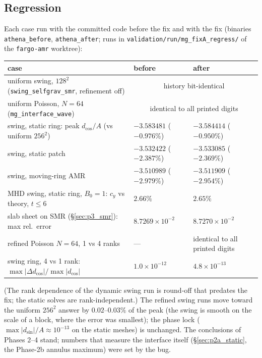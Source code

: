 \documentclass[11pt]{article}
\newcommand{\code}[1]{\texttt{#1}}
\newcommand{\file}[1]{\texttt{#1}}
\begin{document}
\subsection{Regression}
\label{sec:fcfix_regr}
Each case run with the committed code before the fix and with the fix (binaries
\file{athena\_before}, \file{athena\_after}; runs in \file{validation/run/mg\_fixA\_regress/} of
the \code{fargo-amr} worktree):
\begin{center}
\footnotesize\setlength{\tabcolsep}{3pt}
\begin{tabular}{@{}lll@{}}
\toprule
case & before & after \\
\midrule
uniform swing, $128^2$ (\file{swing\_selfgrav\_smr}, refinement off) & \multicolumn{2}{c}{history bit-identical} \\
uniform Poisson, $N = 64$ (\code{mg\_interface\_wave}) & \multicolumn{2}{c}{identical to all printed digits} \\
swing, static ring: peak $d_{\cos}/A$ (vs uniform $256^2$) & $-3.583481$ ($-0.976\%$) & $-3.584414$ ($-0.950\%$) \\
swing, static patch & $-3.532422$ ($-2.387\%$) & $-3.533085$ ($-2.369\%$) \\
swing, moving-ring AMR & $-3.510989$ ($-2.979\%$) & $-3.511909$ ($-2.954\%$) \\
MHD swing, static ring, $B_0 = 1$: $c_y$ vs theory, $t \le 6$ & $2.66\%$ & $2.65\%$ \\
slab sheet on SMR (\S\ref{sec:p3_smr}): max rel.\ error & $8.7269\times10^{-2}$ & $8.7270\times10^{-2}$ \\
refined Poisson $N = 64$, 1 vs 4 ranks & --- & identical to all printed digits \\
swing ring, 4 vs 1 rank: $\max|\Delta d_{\cos}|/\max|d_{\cos}|$ & $1.0\times10^{-12}$ & $4.8\times10^{-13}$ \\
\bottomrule
\end{tabular}
\end{center}
(The rank dependence of the dynamic swing run is round-off that predates the fix; the static
solves are rank-independent.) The refined swing runs move toward the uniform $256^2$ answer by $0.02$--$0.03\%$ of the peak
(the swing is smooth on the scale of a block, where the error was smallest); the phase lock
($\max|d_{\sin}|/A \approx 10^{-13}$ on the static meshes) is unchanged. The conclusions of
Phases 2--4 stand; numbers that measure the interface itself (\S\ref{sec:p2a_static}, the
Phase-2b annulus maximum) were set by the bug.
\end{document}
